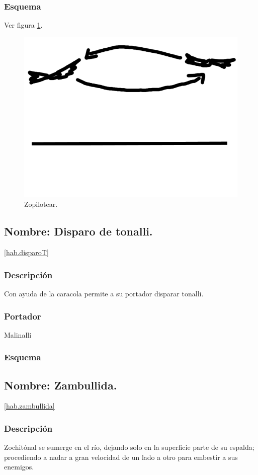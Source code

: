 \documentclass[11pt,letterpaper]{article}
\begin{document}
		\subsubsection{Esquema}
		Ver figura \ref{fig:zopilotear}.
		\begin{figure}
			\centering
			\includegraphics[height=0.2 \textheight]{Imagenes/zopilotear}
			\caption{Zopilotear.}
			\label{fig:zopilotear}
		\end{figure}
\subsection{Nombre: Disparo de tonalli.}\ref{hab.disparoT}
\subsubsection{Descripción}
Con ayuda de la caracola permite a su portador disparar tonalli.
\subsubsection{Portador}
Malinalli
\subsubsection{Esquema}
\subsection{Nombre: Zambullida.}\ref{hab.zambullida}
\subsubsection{Descripción}
Zochitónal se sumerge en el río, dejando solo en la superficie parte de su espalda; procediendo a nadar a gran velocidad de un lado a otro para embestir a sus enemigos.  
\end{document}
